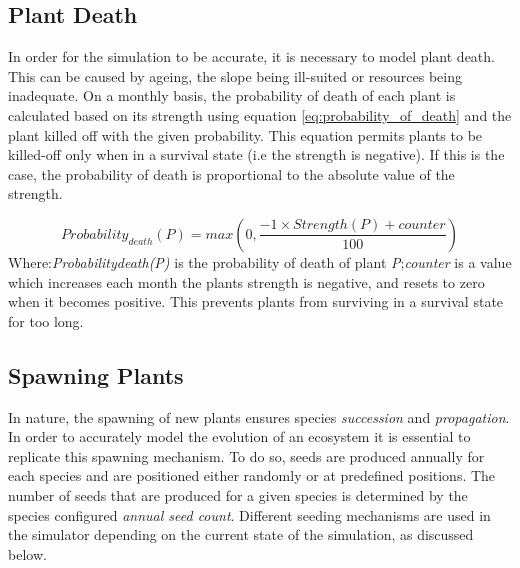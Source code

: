 \subsection{Plant Death}

In order for the simulation to be accurate, it is necessary to model plant death. This can be caused by ageing, the slope being ill-suited or resources being inadequate. On a monthly basis, the probability of death of each plant is calculated based on its strength using equation \ref{eq:probability_of_death} and the plant killed off with the given probability. This equation permits plants to be killed-off only when in a survival state (i.e the strength is negative). If this is the case, the probability of death is proportional to the absolute value of the strength. 

\begin{equation}
Probability_{death}(P) = max(0, \frac{-1 \times Strength(P) + counter}{100})
\label{eq:probability_of_death}
\end{equation}
Where:\textit{Probability{death}(P)} is the probability of death of plant \textit{P};\textit{counter} is a value which increases each month the plants strength is negative, and resets to zero when it becomes positive. This prevents plants from surviving in a survival state for too long.

\subsection{Spawning Plants} \label{subsec:spawning_plants}

In nature, the spawning of new plants ensures species \textit{succession} and \textit{propagation}. In order to accurately model the evolution of an ecosystem it is essential to replicate this spawning mechanism. To do so, seeds are produced annually for each species and are positioned either randomly or at predefined positions. The number of seeds that are produced for a given species is determined by the species configured \textit{annual seed count}. Different seeding mechanisms are used in the simulator depending on the current state of the simulation, as discussed below.\\ 

